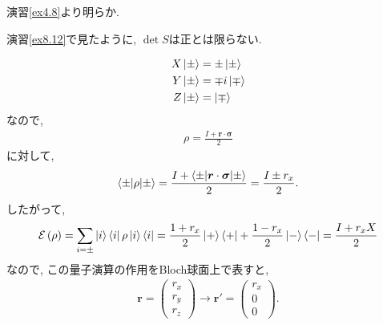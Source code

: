 \begin{ex}
    \label{ex8.13}
    演習\ref{ex4.8}より明らか.
\end{ex}

\begin{ex}
    \label{ex8.14}
    演習\ref{ex8.12}で見たように, $\det S$は正とは限らない.
\end{ex}

\begin{ex}
    \label{ex8.15}
    \begin{align*}
        X \ket{\pm} & = \pm \ket{\pm}  \\
        Y \ket{\pm} & = \mp i\ket{\mp} \\
        Z \ket{\pm} & = \ket{\mp}
    \end{align*}
    なので,
    \begin{align*}
        \rho = \frac{I + \bm{r} \cdot \bm{\sigma}}{2}
    \end{align*}
    に対して,
    \begin{align*}
        \braket{\pm | \rho | \pm}
        =
        \frac{I + \braket{ \pm| \bm{r} \cdot \bm{\sigma} |\pm}}{2}
        =
        \frac{I \pm r_x}{2}.
    \end{align*}
    したがって,
    \begin{align*}
        \mathcal{E}\left( \rho \right)
        =
        \sum_{i = \pm} \ket{i}\bra{i} \rho \ket{i}\bra{i}
        =
        \frac{1 + r_x}{2} \ket{+}\bra{+} + \frac{1 - r_x}{2} \ket{-}\bra{-}
        =
        \frac{I + r_x X}{2}
    \end{align*}
    なので, この量子演算の作用をBloch球面上で表すと,
    \begin{align*}
        \bm{r} =
        \begin{pmatrix}
            r_x \\
            r_y \\
            r_z
        \end{pmatrix}
        \longrightarrow
        \bm{r}' =
        \begin{pmatrix}
            r_x \\
            0   \\
            0
        \end{pmatrix}.
    \end{align*}
\end{ex}

